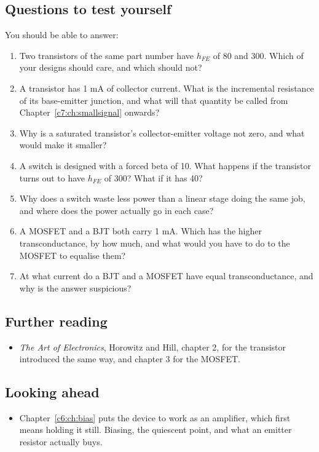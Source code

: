 \subsection*{Questions to test yourself}
You should be able to answer:
\begin{enumerate}
  \item Two transistors of the same part number have $h_{FE}$ of 80 and 300. Which of your designs should care, and which should not?
  \item A transistor has 1 mA of collector current. What is the incremental resistance of its base-emitter junction, and what will that quantity be called from Chapter~\ref{c7:ch:smallsignal} onwards?
  \item Why is a saturated transistor's collector-emitter voltage not zero, and what would make it smaller?
  \item A switch is designed with a forced beta of 10. What happens if the transistor turns out to have $h_{FE}$ of 300? What if it has 40?
  \item Why does a switch waste less power than a linear stage doing the same job, and where does the power actually go in each case?
  \item A MOSFET and a BJT both carry 1 mA. Which has the higher transconductance, by how much, and what would you have to do to the MOSFET to equalise them?
  \item At what current do a BJT and a MOSFET have equal transconductance, and why is the answer suspicious?
\end{enumerate}

\subsection*{Further reading}
\begin{itemize}
  \item \emph{The Art of Electronics}, Horowitz and Hill, chapter 2, for the transistor introduced the same way, and chapter 3 for the MOSFET.
\end{itemize}

\subsection*{Looking ahead}
\begin{itemize}
  \item Chapter~\ref{c6:ch:bias} puts the device to work as an amplifier, which first means holding it still. Biasing, the quiescent point, and what an emitter resistor actually buys.
\end{itemize}
